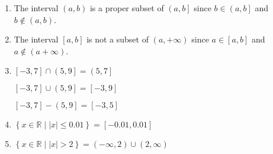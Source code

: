 \documentclass[11pt]{article}
\begin{document}
\begin{enumerate}
\item The interval $\left( {a, b} \right)$  is a proper subset of   $\left( {a, b} \right]$ since 
$ b \in \left( a, b \right]$ and $b \notin \left( a, b \right)$.

\item The interval $\left[ a, b \right]$ is not a subset of $\left( a, + \infty \right)$ since 
$a \in \left[ a, b \right]$ and $a \notin \left( a + \infty \right)$.

\item $\left[ -3, 7 \right] \cap \left( 5, 9 \right] = \left( 5, 7 \right]$

      $\left[ -3, 7 \right] \cup \left( 5, 9 \right] = \left[ -3, 9 \right]$

      $\left[ -3, 7 \right] - \left( 5, 9 \right] = \left[ -3, 5 \right]$

\item $\left\{ {x \in \mathbb{R}} \mid \left| x \right| \leq 0.01 \right\} = \left[ -0.01, 0.01 \right]$

\item $\left\{  x \in \mathbb{R} \mid \left| x \right| > 2 \right\} = \left( { - \infty , 2} \right) \cup \left( {2, \infty } \right)$
\end{enumerate}
\end{document}
